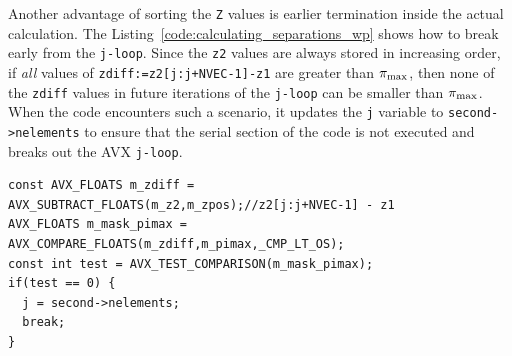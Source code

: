 \documentclass[12pt,titlepage,justified]{article}
\newcommand{\wprp}{\ensuremath{{w_p(r_p)}}\xspace}
\newcommand{\pimax}{\ensuremath{{\pi_{\rm max}}}\xspace}
\begin{document}
Another advantage of sorting the \texttt{Z} values is earlier termination inside the actual calculation. The Listing~\ref{code:calculating_separations_wp} shows 
how to break early from the \texttt{j-loop}. Since the \texttt{z2} values are always stored in increasing order, if {\em all} values of \texttt{zdiff:=z2[j:j+NVEC-1]-z1}
are greater than \pimax, then none of the \texttt{zdiff} values in future iterations of the \texttt{j-loop} can be smaller than \pimax. When the code encounters 
such a scenario, it updates the \texttt{j} variable to \texttt{second->nelements} to ensure that the serial section of the code is not executed and breaks out the 
AVX \texttt{j-loop}. 
\begin{lstlisting}[label={code:calculating_separations_wp},caption={AVX intrinsics for calculating separations in \wprp and checking for early termination.}]
const AVX_FLOATS m_zdiff = AVX_SUBTRACT_FLOATS(m_z2,m_zpos);//z2[j:j+NVEC-1] - z1                                                                                                                                        
AVX_FLOATS m_mask_pimax = AVX_COMPARE_FLOATS(m_zdiff,m_pimax,_CMP_LT_OS);
const int test = AVX_TEST_COMPARISON(m_mask_pimax);
if(test == 0) {
  j = second->nelements;
  break;
}
\end{lstlisting}
\end{document}
